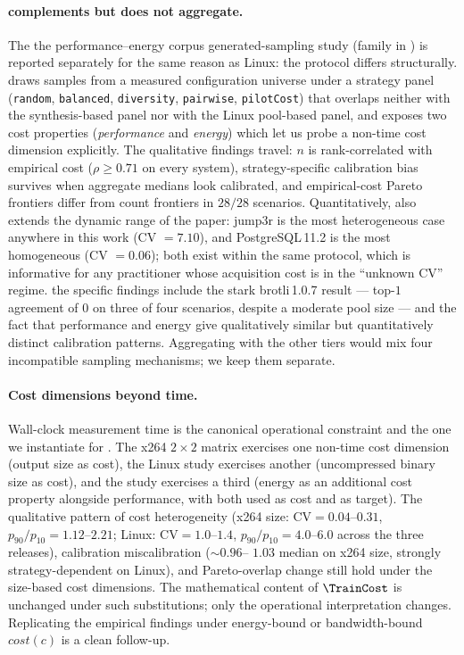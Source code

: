 \paragraph*{\StudyEnergy complements but does not aggregate.}
The the performance--energy corpus generated-sampling study
(\StudyEnergy family in ) is reported separately for the same
reason as Linux: the protocol differs structurally. \StudyEnergy draws
samples from a measured configuration universe under a strategy panel
(\texttt{random}, \texttt{balanced}, \texttt{diversity},
\texttt{pairwise}, \texttt{pilotCost}) that overlaps neither with the
synthesis-based panel nor with the Linux pool-based panel, and
exposes two cost properties (\emph{performance} and \emph{energy})
which let us probe a non-time cost dimension explicitly. The
qualitative findings travel: $n$ is rank-correlated with empirical
cost ($\rho\!\geq\!0.71$ on every system), strategy-specific
calibration bias survives when aggregate medians look calibrated, and
empirical-cost Pareto frontiers differ from count frontiers in
$28/28$ scenarios. Quantitatively, \StudyEnergy also extends the dynamic
range of the paper: jump3r is the most heterogeneous case anywhere in
this work (CV $\!=\!7.10$), and PostgreSQL\,11.2 is the most
homogeneous (CV $\!=\!0.06$); both exist within the same protocol,
which is informative for any practitioner whose acquisition cost is
in the ``unknown CV'' regime. the \StudyEnergy specific findings include the
stark brotli\,1.0.7 result --- top-$1$ agreement of $0$ on three of
four scenarios, despite a moderate pool size --- and the fact that
performance and energy give qualitatively similar but quantitatively
distinct calibration patterns. Aggregating \StudyEnergy with the other tiers
would mix four incompatible sampling mechanisms; we keep them
separate.

\paragraph*{Cost dimensions beyond time.}
Wall-clock measurement time is the canonical operational constraint
and the one we instantiate for \StudyReplication. The x264 $2\times 2$
matrix exercises one non-time cost dimension (output size as cost),
the Linux study exercises another (uncompressed binary size as cost),
and the \StudyEnergy study exercises a third (energy as an additional cost
property alongside performance, with both used as cost and as
target). The qualitative pattern of cost heterogeneity (x264 size:
$\text{CV}=0.04$--$0.31$, $p_{90}/p_{10}=1.12$--$2.21$; Linux:
$\text{CV}\!=\!1.0$--$1.4$, $p_{90}/p_{10}\!=\!4.0$--$6.0$ across
the three releases), calibration miscalibration ($\sim\!\!0.96$--
$1.03$ median on x264 size, strongly strategy-dependent on Linux),
and Pareto-overlap change still hold under the size-based cost
dimensions. The mathematical content of $\TrainCost$ is unchanged
under such substitutions; only the operational interpretation
changes. Replicating the empirical findings under energy-bound or
bandwidth-bound $\mathit{cost}(c)$ is a clean follow-up.

